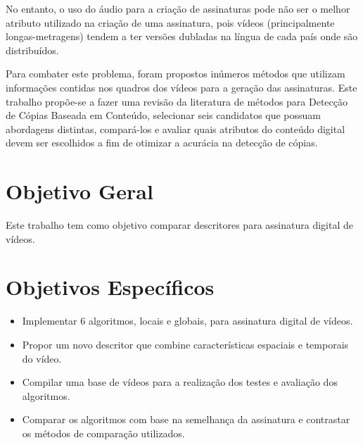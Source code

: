 No entanto, o uso do áudio para a criação de assinaturas pode não ser o melhor atributo utilizado na criação de uma assinatura, pois vídeos (principalmente longas-metragens) tendem a ter versões dubladas na língua de cada país onde são distribuídos. 

Para combater este problema, foram propostos inúmeros métodos que utilizam informações contidas nos quadros dos vídeos para a geração das assinaturas. Este trabalho propõe-se a fazer uma revisão da literatura de métodos para Detecção de Cópias Baseada em Conteúdo, selecionar seis candidatos que possuam abordagens distintas, compará-los e avaliar quais atributos do conteúdo digital devem ser escolhidos a fim de otimizar a acurácia na detecção de cópias. 


\section{Objetivo Geral}
Este trabalho tem como objetivo comparar descritores para assinatura digital de vídeos.

\section{Objetivos Específicos}
\begin{itemize}
\item Implementar 6 algoritmos, locais e globais, para assinatura digital de vídeos.
\item Propor um novo descritor que combine características espaciais e temporais do vídeo.
\item Compilar uma base de vídeos para a realização dos testes e avaliação dos algoritmos.
\item Comparar os algoritmos com base na semelhança da assinatura e contrastar os métodos de comparação utilizados.
\end{itemize}